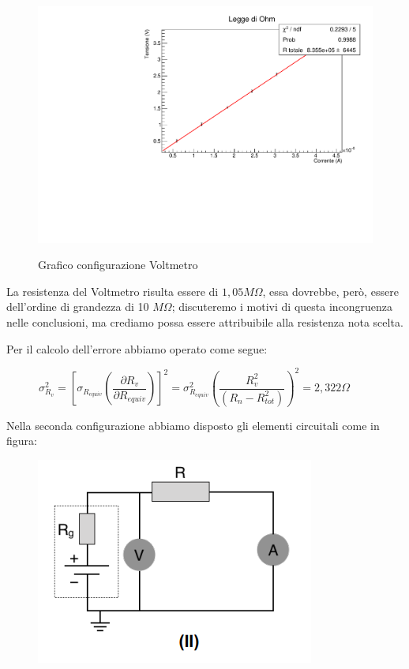 \begin{figure}[H]
    \centering
    \includegraphics[scale=.5]{Immagini/fit1.pdf}
    \label{fig:my_label}
    \caption{Grafico configurazione Voltmetro}
\end{figure}

La resistenza del Voltmetro risulta essere di $1,05M\Omega$, essa dovrebbe, però, essere dell'ordine di grandezza di 10 $M\Omega$; discuteremo i motivi di questa incongruenza nelle conclusioni, ma crediamo possa essere attribuibile alla resistenza nota scelta.

Per il calcolo dell'errore abbiamo operato come segue:

$$
\sigma_{R_v}^2=\left[\sigma_{R_{equiv}}\left(\dfrac{\partial R_v}{\partial R_{equiv}}\right)\right]^2=\sigma^2_{R_{equiv}}\left(\dfrac{R_v^2}{(R_n -R_{tot}^2)}\right)^2=2,322 \Omega
\qquad \text{}
$$


Nella seconda configurazione abbiamo disposto gli elementi circuitali come in figura:

\begin{figure}[H]
    \centering
    \includegraphics[scale=1]{Immagini/Conf2.PNG}
    \label{fig:my_label}
\end{figure}

